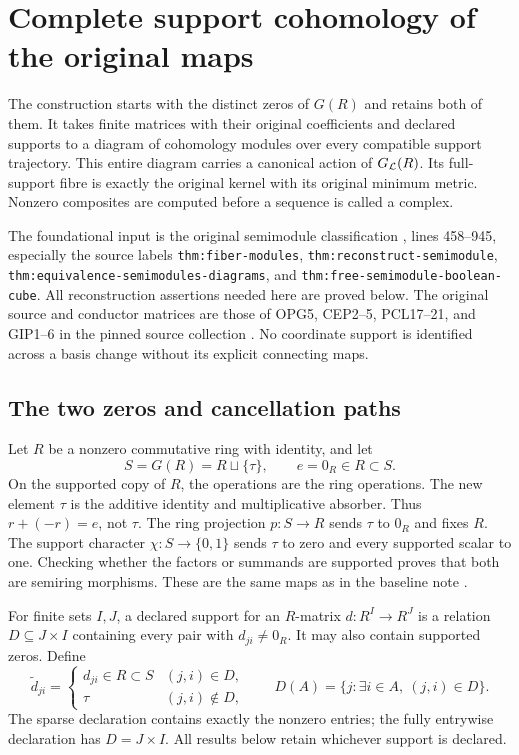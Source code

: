 \documentclass[11pt,a4paper]{article}
\theoremstyle{definition}\newtheorem{definition}[theorem]{Definition}
\begin{document}


\section{Complete support cohomology of the original maps}


The construction starts with the distinct zeros of \(G(R)\) and retains
both of them. It takes finite matrices with their original coefficients
and declared supports to a diagram of cohomology modules over every
compatible support trajectory. This entire diagram carries a canonical
action of \(G_{\mathcal L}(R)\). Its full-support fibre is exactly the original
kernel with its original minimum metric. Nonzero composites are computed
before a sequence is called a complex.

The foundational input is the original semimodule classification
\cite{secondary}, lines 458--945, especially the source labels
\texttt{thm:fiber-modules}, \texttt{thm:reconstruct-semimodule},
\texttt{thm:equivalence-semimodules-diagrams}, and
\texttt{thm:free-semimodule-boolean-cube}.
All reconstruction assertions needed here are proved below.
The original source and conductor matrices are those of OPG5, CEP2--5,
PCL17--21, and GIP1--6 in the pinned source collection \cite{programme}.
No coordinate support is identified across a basis change without its
explicit connecting maps.

\subsection{The two zeros and cancellation paths}

Let \(R\) be a nonzero commutative ring with identity, and let
\[
 S=G(R)=R\sqcup\{\tau\},\qquad e=0_R\in R\subset S.
 \tag{SCD1}
\]
On the supported copy of \(R\), the operations are the ring operations.
The new element \(\tau\) is the additive identity and multiplicative
absorber. Thus \(r+(-r)=e\), not \(\tau\).
The ring projection \(p:S\to R\) sends \(\tau\) to \(0_R\) and fixes
\(R\). The support character \(\chi:S\to\{0,1\}\) sends \(\tau\) to zero
and every supported scalar to one. Checking whether the factors or
summands are supported proves that both are semiring morphisms.
These are the same maps as in the baseline note \cite{globalization}.

For finite sets \(I,J\), a declared support for an \(R\)-matrix
\(d:R^I\to R^J\) is a relation \(D\subseteq J\times I\) containing
every pair with \(d_{ji}\ne0_R\). It may also contain supported zeros.
Define
\[
 \widetilde d_{ji}=
 \begin{cases}d_{ji}\in R\subset S &(j,i)\in D,\\
 \tau &(j,i)\notin D,
 \end{cases}
 \qquad
 D(A)=\{j:\exists i\in A,\ (j,i)\in D\}.
 \tag{SCD2}
\]
The sparse declaration contains exactly the nonzero entries;
the fully entrywise declaration has \(D=J\times I\).
All results below retain whichever support is declared.
\end{document}
